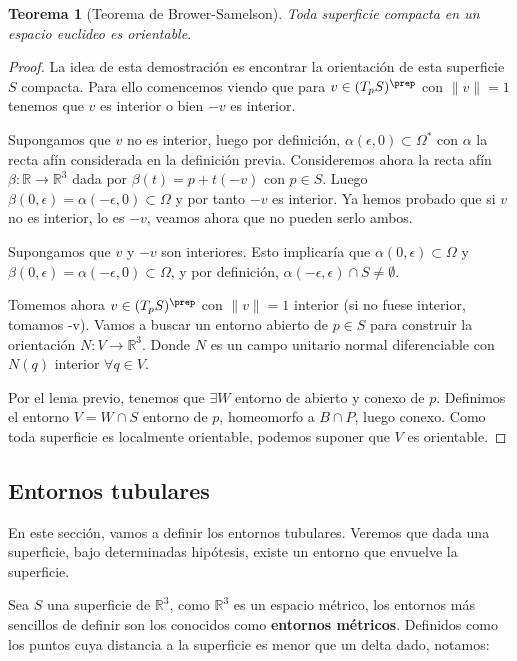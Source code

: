 \documentclass[paper=a4, fontsize=11pt, spanish]{scrartcl}
\newcommand{\rtres}{\mathbb{R}^3}
\newtheorem{theorem}{Teorema}[section]
\theoremstyle{definition}
\theoremstyle{definition}
\theoremstyle{definition}
\begin{document}
\begin{theorem}[Teorema de Brower-Samelson]
Toda superficie compacta en un espacio euclideo es orientable.
\end{theorem}
\begin{proof}
La idea de esta demostración es encontrar la orientación de esta superficie $S$ compacta. Para ello comencemos viendo que para $v \in (T_pS)^{\prep}$ con $\parallel v \parallel=1$ tenemos que $v$ es interior o bien $-v$ es interior.

Supongamos que $v$ no es interior, luego por definición, $\alpha(\epsilon, 0) \subset \Omega^{*}$ con $\alpha$ la recta afín considerada en la definición previa. Consideremos ahora la recta afín $\beta: \mathbb{R} \longrightarrow \rtres$ dada por $\beta(t)=p + t(-v)$ con $p \in S$. Luego $\beta(0, \epsilon) = \alpha(-\epsilon, 0) \subset \Omega$ y por tanto $-v$ es interior. Ya hemos probado que si $v$ no es interior, lo es $-v$, veamos ahora que no pueden serlo ambos.

Supongamos que $v$ y $-v$ son interiores. Esto implicaría que $\alpha(0,\epsilon) \subset \Omega$ y $\beta(0, \epsilon) = \alpha(-\epsilon, 0) \subset \Omega$, y por definición, $\alpha(-\epsilon, \epsilon) \cap S \neq \emptyset$.

Tomemos ahora $v \in (T_pS)^{\prep}$ con $\parallel v \parallel=1$ interior (si no fuese interior, tomamos -v). Vamos a buscar un entorno abierto de $p \in S$ para construir la orientación $N: V \longrightarrow \rtres$. Donde $N$ es un campo unitario normal diferenciable con $N(q)$ interior $\forall q \in V.$

Por el lema previo, tenemos que $\exists W$ entorno de abierto y conexo de $p$. Definimos el entorno $V=W\cap S$ entorno de $p$, homeomorfo a $B\cap P$, luego conexo. Como toda superficie es localmente orientable, podemos suponer que $V$ es orientable.

\end{proof}

\subsection{Entornos tubulares}

En este sección, vamos a definir los entornos tubulares. Veremos que dada una superficie, bajo determinadas hipótesis, existe un entorno que envuelve la superficie.

Sea $S$ una superficie de $\rtres$, como $\rtres$ es un espacio métrico, los entornos más sencillos de definir son los conocidos como \textbf{entornos métricos}. Definidos como los puntos cuya distancia a la superficie es menor que un delta dado, notamos:
\end{document}
